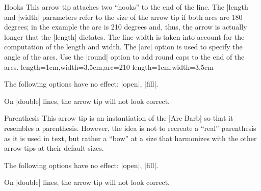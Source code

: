 \begin{arrowtip}{Hooks}{
    This arrow tip attaches two ``hooks'' to the end of the line. The |length|
    and |width| parameters refer to the size of the arrow tip if both arcs are
    180 degrees; in the example the arc is 210 degrees and, thus, the arrow is
    actually longer that the |length| dictates. The line width is taken into
    account for the computation of the length and width. The |arc| option is
    used to specify the angle of the arcs. Use the |round| option to add round
    caps to the end of the arcs.
}%
{length=1cm,width=3.5cm,arc=210}%
{length=1cm,width=3.5cm}

    \begin{arrowexamples}
        \arrowexample[]
        \arrowexampledup[sep]
        \arrowexampledupdot[sep]
        \arrowexample[arc=120]
        \arrowexample[arc=270]
        \arrowexample[length=2pt]
        \arrowexample[length=2pt,width=5pt]
        \arrowexample[line width=2pt]
        \arrowexample[reversed]
        \arrowexample[round]
        \arrowexample[slant=.3]
        \arrowexample[left]
        \arrowexample[right]
        \arrowexample[red]
    \end{arrowexamples}
    The following options have no effect: |open|, |fill|.

    On |double| lines, the arrow tip will not look correct.
\end{arrowtip}

\begin{arrowtip}{Parenthesis}{
    This arrow tip is an instantiation of the |Arc Barb|  so that it resembles a
    parenthesis. However, the idea is not to recreate a ``real'' parenthesis as
    it is used in text, but rather a ``bow'' at a size that harmonizes with the
    other arrow tips at their default sizes.
}%
{}%
{}

    \begin{arrowexamples}
        \arrowexample[]
        \arrowexampledup[sep]
        \arrowexampledupdot[sep]
        \arrowexample[reversed]
        \arrowexample[round]
        \arrowexample[slant=.3]
        \arrowexample[left]
        \arrowexample[right]
        \arrowexample[red]
    \end{arrowexamples}
    The following options have no effect: |open|, |fill|.

    On |double| lines, the arrow tip will not look correct.
\end{arrowtip}

